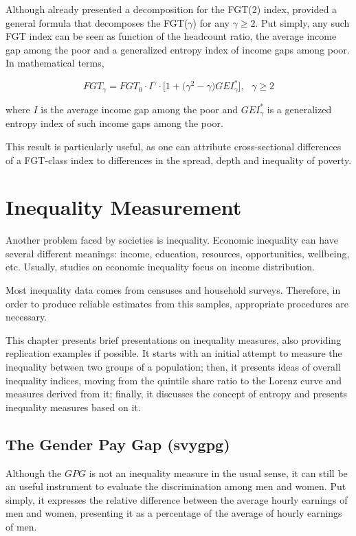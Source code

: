 \documentclass[]{book}
\begin{document}
Although \citet{foster1984} already presented a decomposition for the
FGT(2) index, \citet{aristondo2010} provided a general formula that
decomposes the FGT(\(\gamma\)) for any \(\gamma \geqslant 2\). Put
simply, any such FGT index can be seen as function of the headcount
ratio, the average income gap among the poor and a generalized entropy
index of income gaps among poor. In mathematical terms,

\[
FGT_\gamma = FGT_0 \cdot I^\gamma \cdot \big[ 1 + \big( \gamma^2 -\gamma \big) GEI_\gamma^* \big] , \text{ } \gamma \geq 2
\]

where \(I\) is the average income gap among the poor and
\(GEI_\gamma^*\) is a generalized entropy index of such income gaps
among the poor.

This result is particularly useful, as one can attribute cross-sectional
differences of a FGT-class index to differences in the spread, depth and
inequality of poverty.

\chapter{Inequality Measurement}\label{inequality}

Another problem faced by societies is inequality. Economic inequality
can have several different meanings: income, education, resources,
opportunities, wellbeing, etc. Usually, studies on economic inequality
focus on income distribution.

Most inequality data comes from censuses and household surveys.
Therefore, in order to produce reliable estimates from this samples,
appropriate procedures are necessary.

This chapter presents brief presentations on inequality measures, also
providing replication examples if possible. It starts with an initial
attempt to measure the inequality between two groups of a population;
then, it presents ideas of overall inequality indices, moving from the
quintile share ratio to the Lorenz curve and measures derived from it;
finally, it discusses the concept of entropy and presents inequality
measures based on it.

\section{The Gender Pay Gap (svygpg)}\label{the-gender-pay-gap-svygpg}

Although the \(GPG\) is not an inequality measure in the usual sense, it
can still be an useful instrument to evaluate the discrimination among
men and women. Put simply, it expresses the relative difference between
the average hourly earnings of men and women, presenting it as a
percentage of the average of hourly earnings of men.
\end{document}
